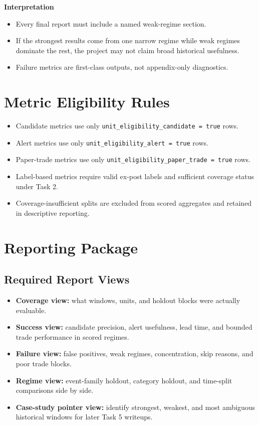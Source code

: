 \documentclass{article}
\begin{document}
\textbf{Interpretation}
\begin{itemize}
\item Every final report must include a named weak-regime section.
\item If the strongest results come from one narrow regime while weak regimes dominate the rest, the project may not claim broad historical usefulness.
\item Failure metrics are first-class outputs, not appendix-only diagnostics.
\end{itemize}

\section*{Metric Eligibility Rules}

\begin{itemize}
\item Candidate metrics use only \texttt{unit\_eligibility\_candidate = true} rows.
\item Alert metrics use only \texttt{unit\_eligibility\_alert = true} rows.
\item Paper-trade metrics use only \texttt{unit\_eligibility\_paper\_trade = true} rows.
\item Label-based metrics require valid ex-post labels and sufficient coverage status under Task 2.
\item Coverage-insufficient splits are excluded from scored aggregates and retained in descriptive reporting.
\end{itemize}

\section*{Reporting Package}

\subsection*{Required Report Views}

\begin{itemize}
\item \textbf{Coverage view:} what windows, units, and holdout blocks were actually evaluable.
\item \textbf{Success view:} candidate precision, alert usefulness, lead time, and bounded trade performance in scored regimes.
\item \textbf{Failure view:} false positives, weak regimes, concentration, skip reasons, and poor trade blocks.
\item \textbf{Regime view:} event-family holdout, category holdout, and time-split comparisons side by side.
\item \textbf{Case-study pointer view:} identify strongest, weakest, and most ambiguous historical windows for later Task 5 writeups.
\end{itemize}
\end{document}

